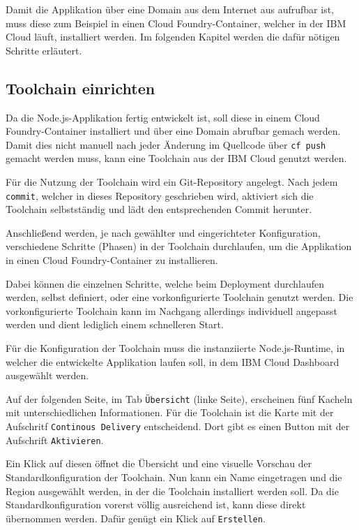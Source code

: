 Damit die Applikation über eine Domain aus dem Internet aus aufrufbar ist, muss diese zum Beispiel in einen Cloud
Foundry-Container, welcher in der IBM Cloud läuft, installiert werden. Im folgenden Kapitel werden die dafür nötigen
Schritte erläutert.

\subsection{Toolchain einrichten}
Da die Node.js-Applikation fertig entwickelt ist, soll diese in einem Cloud Foundry-Container installiert und über eine
Domain abrufbar gemach werden. Damit dies nicht manuell nach jeder Änderung im Quellcode über \texttt{cf push} gemacht
werden muss, kann eine Toolchain aus der IBM Cloud genutzt werden.

Für die Nutzung der Toolchain wird ein Git-Repository angelegt. Nach jedem \texttt{commit}, welcher in dieses Repository
geschrieben wird, aktiviert sich die Toolchain selbstständig und lädt den entsprechenden Commit herunter.

Anschließend werden, je nach gewählter und eingerichteter Konfiguration, verschiedene Schritte (Phasen) in der Toolchain
durchlaufen, um die Applikation in einen Cloud Foundry-Container zu installieren.

Dabei können die einzelnen Schritte, welche beim Deployment durchlaufen werden, selbst definiert, oder eine
vorkonfigurierte Toolchain genutzt werden. Die vorkonfigurierte Toolchain kann im Nachgang allerdings individuell
angepasst werden und dient lediglich einem schnelleren Start.

Für die Konfiguration der Toolchain muss die instanziierte Node.js-Runtime, in welcher die entwickelte Applikation laufen
soll, in dem IBM Cloud Dashboard ausgewählt werden.

Auf der folgenden Seite, im Tab \texttt{Übersicht} (linke Seite), erscheinen fünf Kacheln mit unterschiedlichen Informationen.
Für die Toolchain ist die Karte mit der Aufschritf \texttt{Continous Delivery} entscheidend. Dort gibt es einen Button
mit der Aufschrift \texttt{Aktivieren}.

Ein Klick auf diesen öffnet die Übersicht und eine visuelle Vorschau der Standardkonfiguration der Toolchain. Nun kann ein
Name eingetragen und die Region ausgewählt werden, in der die Toolchain installiert werden soll. Da die Standardkonfiguration
vorerst völlig ausreichend ist, kann diese direkt übernommen werden. Dafür genügt ein Klick auf \texttt{Erstellen}.

